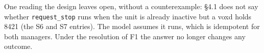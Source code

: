 \documentclass[a4paper,10pt,fleqn]{article}
\begin{document}
One reading the design leaves open, without a counterexample: \S4.1 does not
say whether \texttt{request\_stop} runs when the unit is already inactive but
a voxd holds 8421 (the S6 and S7 entries). The model assumes it runs, which
is idempotent for both managers. Under the resolution of F1 the answer no
longer changes any outcome.
\end{document}

